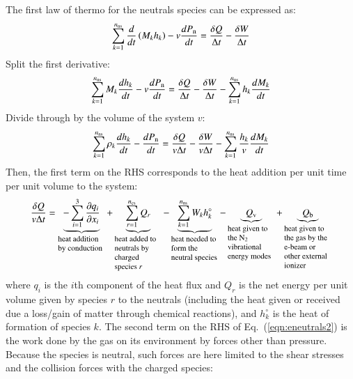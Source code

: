 \documentclass{warpdoc}
\newcommand{\nns}{{n_{\rm ns}}}
\newcommand{\ncs}{{n_{\rm cs}}}
\begin{document}
The first law of thermo for the neutrals species can be expressed as:
%
\begin{equation}
 \sum_{k=1}^\nns \frac{d }{d t}\left(M_k h_k\right) - v \frac{d P_{\rm n}}{dt} = \frac{\delta Q}{\Delta t}-\frac{\delta W}{\Delta t}
\end{equation}
%
Split the first derivative:
%
\begin{equation}
 \sum_{k=1}^\nns M_k\frac{d h_k}{d t} - v \frac{d P_{\rm n}}{dt} = \frac{\delta Q}{\Delta t}-\frac{\delta W}{\Delta t}-\sum_{k=1}^\nns h_k\frac{d M_k}{d t}
\end{equation}
%
Divide through by the volume of the system $v$:
%
\begin{equation}
\sum_{k=1}^\nns \rho_k \frac{d h_k}{d t} -  \frac{d P_{\rm n}}{dt} = 
 \frac{\delta Q}{v \Delta t}
-\frac{\delta W}{v \Delta t}
-\sum_{k=1}^\nns \frac{h_k}{v}\frac{d M_k}{d t}
\label{eqn:eneutrals2}
\end{equation}
%  
Then, the first term on the RHS corresponds to the heat addition per unit time per unit volume to the system:
%
\begin{equation}
\frac{\delta Q}{v \Delta t}
= 
\underbrace{
  -\sum_{i=1}^{3}\frac{\partial q_i}{\partial x_i}
}_{\begin{minipage}{1.7cm}\flushleft \footnotesize heat addition by conduction\end{minipage}}
+
\underbrace{
\sum_{r=1}^{\ncs} Q_{r}
}_{\begin{minipage}{1.7cm}\flushleft \footnotesize heat added to neutrals by charged species $r$\end{minipage}}
-
\underbrace{
\sum_{k=1}^\nns W_k h_k^\circ
}_{\begin{minipage}{1.7cm}\flushleft \footnotesize heat needed to form the neutral species \end{minipage}}
-
\underbrace{
  Q_{\rm v}
}_{\begin{minipage}{1.7cm}\flushleft \footnotesize heat given to the N$_2$ vibrational energy modes \end{minipage}}
+
\underbrace{
  Q_{\rm b}
}_{\begin{minipage}{1.7cm}\flushleft \footnotesize heat given to the gas by the e-beam or other external ionizer \end{minipage}}
\end{equation}
%
where $q_i$ is the $i$th component of the heat flux and $Q_{r}$ is the net energy per unit volume given by species $r$ to the neutrals (including the heat given or received due a loss/gain of matter through chemical reactions), and $h_k^\circ$ is the heat of formation of species $k$. The second term on the RHS of Eq.\ (\ref{eqn:eneutrals2}) is the work done by the gas on its environment by forces other than pressure. Because the species is neutral, such forces are here limited to the shear stresses and the collision forces with the charged species:
\end{document}
